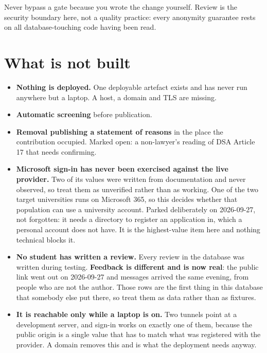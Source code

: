 \documentclass[11pt,a4paper]{article}
\begin{document}
\begin{careful}
Never bypass a gate because you wrote the change yourself. Review is the
security boundary here, not a quality practice: every anonymity guarantee rests
on all database-touching code having been read.
\end{careful}

\section{What is not built}

\begin{itemize}[leftmargin=*]
  \item \textbf{Nothing is deployed.} One deployable artefact exists and has
        never run anywhere but a laptop. A host, a domain and TLS are missing.
  \item \textbf{Automatic screening} before publication.
  \item \textbf{Removal publishing a statement of reasons} in the place the
        contribution occupied. Marked open: a non-lawyer's reading of DSA
        Article 17 that needs confirming.
  \item \textbf{Microsoft sign-in has never been exercised against the live
        provider.} Two of its values were written from documentation and never
        observed, so treat them as unverified rather than as working. One of
        the two target universities runs on Microsoft 365, so this decides
        whether that population can use a university account. Parked
        deliberately on 2026-09-27, not forgotten: it needs a directory to
        register an application in, which a personal account does not have. It
        is the highest-value item here and nothing technical blocks it.
  \item \textbf{No student has written a review.} Every review in the database
        was written during testing. \textbf{Feedback is different and is now
        real}: the public link went out on 2026-09-27 and messages arrived the
        same evening, from people who are not the author. Those rows are the
        first thing in this database that somebody else put there, so treat
        them as data rather than as fixtures.
  \item \textbf{It is reachable only while a laptop is on.} Two tunnels point
        at a development server, and sign-in works on exactly one of them,
        because the public origin is a single value that has to match what was
        registered with the provider. A domain removes this and is what the
        deployment needs anyway.
\end{itemize}
\end{document}
